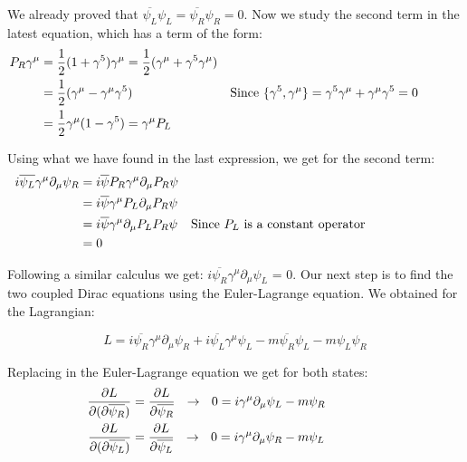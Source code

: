 We already proved that $\overline{\psi_L}\psi_L = \overline{\psi_R}\psi_R = 0$. Now we study the second term in the latest equation, which has a term of the form:
\begin{align}
  &\begin{aligned}
     \mathllap{P_R\gamma^\mu}  &= \frac{1}{2} (1 + \gamma^5)\gamma^\mu = \frac{1}{2} (\gamma^\mu + \gamma^5 \gamma^\mu) \\        
     \mathllap{}            &= \frac{1}{2} (\gamma^\mu - \gamma^\mu \gamma^5) & \text{Since $\{\gamma^5,\gamma^\mu\} = \gamma^5\gamma^\mu + \gamma^\mu \gamma^5 = 0$} \\
     \mathllap{}            &= \frac{1}{2} \gamma^\mu (1 - \gamma^5) = \gamma^\mu P_L 
  &\end{aligned}
\end{align}

Using what we have found in the last expression, we get for the second term:
\begin{align}
  &\begin{aligned}
     \mathllap{i\overline{\psi_L}\gamma^\mu \partial_\mu \psi_R}  &=  i \overline{\psi}P_R \gamma^\mu \partial_\mu P_R \psi\\        
     \mathllap{}            &=  i \overline{\psi}\gamma^\mu P_L \partial_\mu P_R\psi \\
     \mathllap{}            &=  i \overline{\psi}\gamma^\mu \partial_\mu P_L P_R \psi && \text{Since $P_L$ is a constant operator}\\
     \mathllap{}            &=  0
  &\end{aligned}
\end{align}

Following a similar calculus we get: $i\overline{\psi_R}\gamma^\mu \partial_\mu \psi_L$ = 0. Our next step is to find the two coupled Dirac equations using the Euler-Lagrange equation. We obtained for the Lagrangian:

\begin{equation}
L = i \overline{\psi_R} \gamma^\mu \partial_\mu \psi_R + i \overline{\psi_L}\gamma^\mu \psi_L -m\overline{\psi_R}\psi_L - m \psi_L\psi_R
\end{equation}

Replacing in the Euler-Lagrange equation we get for both states:
\begin{align*}
  &\begin{aligned}
     \mathllap{\frac{\partial L}{\partial(\partial \overline{\psi_R})}}  &=  \frac{\partial L}{\partial \overline{\psi_R}} \ \ \rightarrow \ \ 0 = i \gamma^\mu \partial_\mu \psi_L -m \psi_R  \\        
     \mathllap{\frac{\partial L}{\partial(\partial \overline{\psi_L})}}  &=  \frac{\partial L}{\partial \overline{\psi_L}} \ \ \rightarrow \ \ 0 = i \gamma^\mu \partial_\mu \psi_R -m \psi_L\\ 
  &\end{aligned} \label{major start}
\end{align*}

